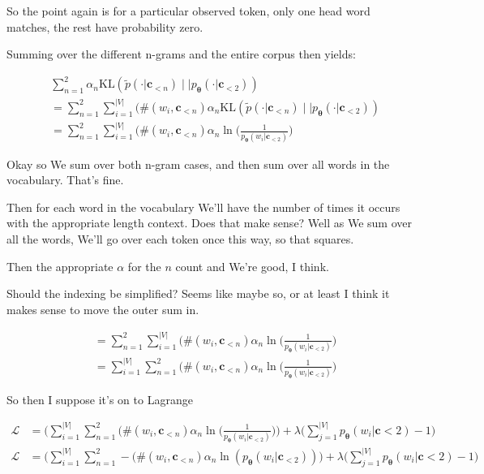 \documentclass{article}
\newcommand{\KL}{\mathrm{KL}}
\newcommand{\vtheta}{\boldsymbol{\theta}}
\newcommand{\model}{p_{\vtheta}}
\newcommand{\context}{\boldsymbol{c}}
\begin{document}
			So the point again is for a particular observed token, only one head word matches, the rest have probability zero. 
			
			Summing over the different n-grams and the entire corpus then yields:
			
			\begin{align}
				&\sum^2_{n=1} \alpha_n \KL (\tilde{p}(\cdot | \context_{<n}) \mid\mid \model(\cdot | \context_{<2})) \\
				&= \sum^2_{n=1} \sum^{|V|}_{i=1} (\#(w_i, \context_{<n})\alpha_n \KL(\tilde{p}(\cdot | \context_{<n}) \mid\mid \model(\cdot | \context_{<2}))\\
				&= \sum^2_{n=1} \sum^{|V|}_{i=1} (\#(w_i, \context_{<n})\alpha_n \ln\bigg( \frac{1}{\model(w_i | \context_{<2})} \bigg)
			\end{align}
		
			Okay so We sum over both n-gram cases, and then sum over all words in the vocabulary. That's fine.
			
			Then for each word in the vocabulary We'll have the number of times it occurs with the appropriate length context. Does that make sense? Well as We sum over all the words, We'll go over each token once this way, so that squares. 
			
			Then the appropriate $\alpha$ for the $n$ count and We're good, I think.
			
			Should the indexing be simplified? Seems like maybe so, or at least I think it makes sense to move the outer sum in.
			
		
			
			\begin{align}
				&= \sum^2_{n=1} \sum^{|V|}_{i=1} (\#(w_i, \context_{<n})\alpha_n \ln\bigg( \frac{1}{\model(w_i | \context_{<2})} \bigg)\\
				&= \sum^{|V|}_{i=1}  \sum^2_{n=1} (\#(w_i, \context_{<n})\alpha_n \ln\bigg( \frac{1}{\model(w_i | \context_{<2})} \bigg)
			\end{align}
			
			So then I suppose it's on to Lagrange
			
			\begin{align}
				\mathcal{L} &= \bigg(\sum^{|V|}_{i=1}  \sum^2_{n=1} (\#(w_i, \context_{<n})\alpha_n \ln\bigg( \frac{1}{\model(w_i | \context_{<2})} \bigg)\bigg) + \lambda\bigg(\sum^{|V|}_{j=1} \model(w_i|\context{<2})-1 \bigg)\\
				\mathcal{L} &= \bigg(\sum^{|V|}_{i=1}  \sum^2_{n=1} -(\#(w_i, \context_{<n})\alpha_n \ln( \model(w_i | \context_{<2}))\bigg) + \lambda\bigg(\sum^{|V|}_{j=1} \model(w_i|\context{<2})-1 \bigg)
			\end{align}
			
\end{document}
